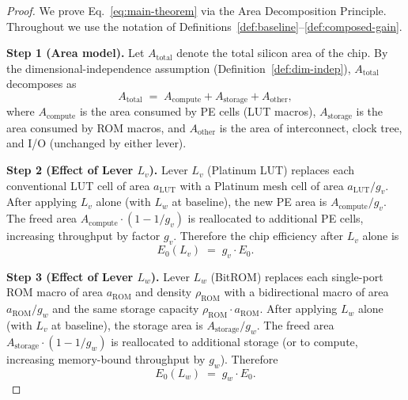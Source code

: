 \begin{proof}
  We prove Eq.~\eqref{eq:main-theorem} via the Area Decomposition Principle.
  Throughout we use the notation of Definitions~\ref{def:baseline}--\ref{def:composed-gain}.

  \textbf{Step 1 (Area model).}
  Let $A_{\text{total}}$ denote the total silicon area of the chip.
  By the dimensional-independence assumption (Definition~\ref{def:dim-indep}),
  $A_{\text{total}}$ decomposes as
  \begin{equation}
    A_{\text{total}} \;=\; A_{\text{compute}} + A_{\text{storage}} + A_{\text{other}},
    \label{eq:area-decomp}
  \end{equation}
  where $A_{\text{compute}}$ is the area consumed by PE cells (LUT macros),
  $A_{\text{storage}}$ is the area consumed by ROM macros,
  and $A_{\text{other}}$ is the area of interconnect, clock tree, and I/O
  (unchanged by either lever).

  \textbf{Step 2 (Effect of Lever $L_v$).}
  Lever $L_v$ (Platinum LUT) replaces each conventional LUT cell of area
  $a_{\text{LUT}}$ with a Platinum mesh cell of area
  $a_{\text{LUT}} / g_v$.
  After applying $L_v$ alone (with $L_w$ at baseline), the new PE area is
  $A_{\text{compute}} / g_v$.
  The freed area $A_{\text{compute}} \cdot (1 - 1/g_v)$ is reallocated to
  additional PE cells, increasing throughput by factor $g_v$.
  Therefore the chip efficiency after $L_v$ alone is
  \begin{equation}
    E_0(L_v) \;=\; g_v \cdot E_0.
    \label{eq:eff-lv}
  \end{equation}

  \textbf{Step 3 (Effect of Lever $L_w$).}
  Lever $L_w$ (BitROM) replaces each single-port ROM macro of area $a_{\text{ROM}}$
  and density $\rho_{\text{ROM}}$ with a bidirectional macro of area $a_{\text{ROM}} / g_w$
  and the same storage capacity $\rho_{\text{ROM}} \cdot a_{\text{ROM}}$.
  After applying $L_w$ alone (with $L_v$ at baseline), the storage area is
  $A_{\text{storage}} / g_w$.
  The freed area $A_{\text{storage}} \cdot (1 - 1/g_w)$ is reallocated to
  additional storage (or to compute, increasing memory-bound throughput by $g_w$).
  Therefore
  \begin{equation}
    E_0(L_w) \;=\; g_w \cdot E_0.
    \label{eq:eff-lw}
  \end{equation}


\end{proof}
